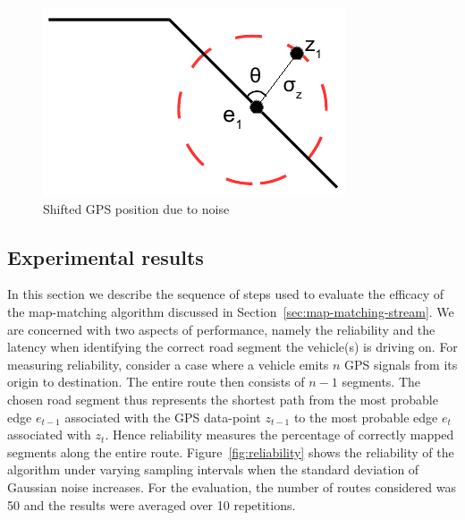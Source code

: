 \documentclass{wscpaperproc}
\theoremstyle{wsc}
\begin{document}
\begin{figure}[!htbp]
 \centering
 \includegraphics[scale=0.8]{gaussian_noise.pdf}
 \caption{Shifted GPS position due to noise}
 \label{fig:noise}
\end{figure}



\subsection{Experimental results}
\label{subsec:exp-setup}

In this section we describe the sequence of steps used to evaluate the efficacy of the map-matching algorithm discussed in Section~\ref{sec:map-matching-stream}. We are concerned with two aspects of performance, namely the reliability and the latency when identifying the correct road segment the vehicle(s) is driving on. For measuring reliability, consider a case where a vehicle emits $n$ GPS signals from its origin to destination. The entire route then consists of $n-1$ segments. The chosen road segment thus represents the shortest path from the most probable edge $e_{t-1}$ associated with the GPS data-point $z_{t-1}$ to the most probable edge $e_{t}$ associated with $z_{t}$. Hence reliability measures the percentage of correctly mapped segments along the entire route. Figure~\ref{fig:reliability} shows the reliability of the algorithm under varying sampling intervals when the standard deviation of Gaussian noise increases. For the evaluation, the number of routes considered was 50 and the results were averaged over 10 repetitions.
\end{document}
